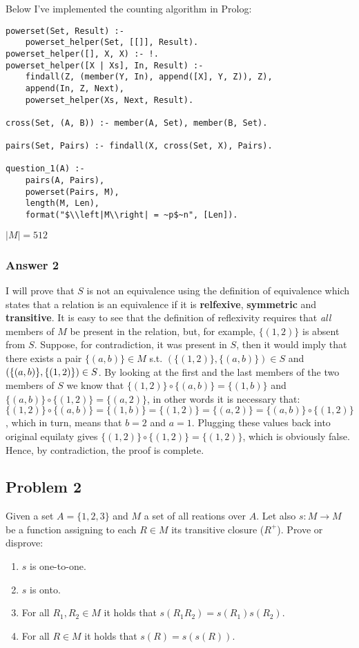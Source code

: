 \documentclass[11pt]{article}
\begin{document}
Below I've implemented the counting algorithm in Prolog:

\lstset{language=prolog,numbers=none}
\begin{lstlisting}
powerset(Set, Result) :-
    powerset_helper(Set, [[]], Result).
powerset_helper([], X, X) :- !.
powerset_helper([X | Xs], In, Result) :-
    findall(Z, (member(Y, In), append([X], Y, Z)), Z),
    append(In, Z, Next),
    powerset_helper(Xs, Next, Result).

cross(Set, (A, B)) :- member(A, Set), member(B, Set).

pairs(Set, Pairs) :- findall(X, cross(Set, X), Pairs).

question_1(A) :-
    pairs(A, Pairs),
    powerset(Pairs, M),
    length(M, Len),
    format("$\\left|M\\right| = ~p$~n", [Len]).
\end{lstlisting}

$\left|M\right| = 512$
\subsubsection{Answer 2}
\label{sec-1-1-2}
I will prove that $S$ is not an equivalence using the definition of
equivalence which states that a relation is an equivalence if it is
\textbf{relfexive}, \textbf{symmetric} and \textbf{transitive}.  It is easy to see that the
definition of reflexivity requires that \emph{all} members of $M$ be present in
the relation, but, for example, $\{(1, 2)\}$ is absent from $S$.  Suppose,
for contradiction, it was present in $S$, then it would imply that there
exists a pair $\{(a, b)\} \in M$ s.t. $(\{(1, 2)\}, \{(a, b)\}) \in S$ and
$(\{(a, b)\}, \{(1, 2)\}) \in\nobreak S$.  By looking at the first and the
last members of the two members of $S$ we know that $\{(1, 2)\} \circ \{(a,
    b)\} = \{(1, b)\}$ and $\{(a, b)\} \circ \{(1, 2)\} = \{(a, 2)\}$, in other
words it is necessary that: $\{(1, 2)\} \circ \{(a, b)\} = \{(1, b)\} =
    \{(1, 2)\} = \{(a, 2)\} = \{(a, b)\} \circ \{(1, 2)\}$, which in turn, means
that $b=2$ and $a=1$.  Plugging these values back into original equilaty
gives $\{(1, 2)\} \circ \{(1, 2)\} = \{(1, 2)\}$, which is obviously false.
Hence, by contradiction, the proof is complete.
\subsection{Problem 2}
\label{sec-1-2}
Given a set $A=\{1, 2, 3\}$ and $M$ a set of all reations over $A$.  Let also
$s : M \to M$ be a function assigning to each $R \in M$ its transitive
closure ($R^{+}$).  Prove or disprove:
\begin{enumerate}
\item $s$ is one-to-one.
\item $s$ is onto.
\item For all $R_1,R_2 \in M$ it holds that $s(R_1R_2) = s(R_1)s(R_2)$.
\item For all $R \in M$ it holds that $s(R) = s(s(R))$.
\end{enumerate}
\end{document}
